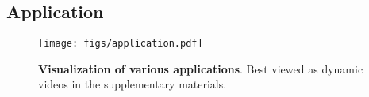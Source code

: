 









\subsection{Application}
\begin{figure}
  \centering
    \texttt{[image: figs/application.pdf]}
    \label{fig:short-a}
  \caption{\textbf{Visualization of various applications}. Best viewed as dynamic videos in the supplementary materials.}
  \vspace{-4mm}
  \label{fig:application_visualization}
\end{figure}



